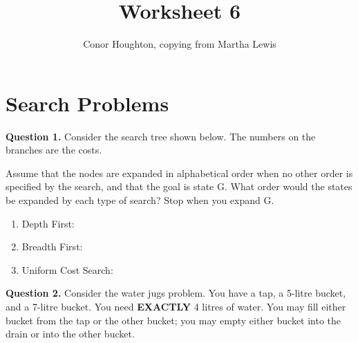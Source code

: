 \documentclass[a4paper,12pt]{article}
\title{Worksheet 6}
\author{Conor Houghton, copying from Martha Lewis}
\date{}
\begin{document}
\maketitle

\section*{Search Problems}

\textbf{Question 1.} Consider the search tree shown below. The numbers on the branches are the costs.
\begin{center}
\end{center}

Assume that the nodes are expanded in alphabetical order when no other order is specified by the search, and that the goal is state G. What order would the states be expanded by each type of search? Stop when you expand G.

\begin{enumerate}
    \item Depth First:
    \item Breadth First:
    \item Uniform Cost Search:
\end{enumerate}

\noindent \textbf{Question 2.} Consider the water jugs problem. You have a tap, a 5-litre bucket, and a 7-litre bucket. You need \textbf{EXACTLY} 4 litres of water. You may fill either bucket from the tap or the other bucket; you may empty either bucket into the drain or into the other bucket.
\end{document}
